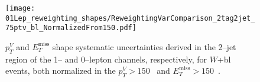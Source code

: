 \begin{figure}[ht!]
  \centering
  \texttt{[image: 01Lep\_reweighting\_shapes/ReweightingVarComparison\_2tag2jet\_75ptv\_bl\_NormalizedFrom150.pdf]}
  \caption[A normalised comparison of 0-- and 1--lepton channel derived $p_T^V$ and
  $E_T^{\text{miss}}$ shape systematic uncertainties on $W+$jets
  events.]{$p_T^V$ and $E_T^{\text{miss}}$ shape systematic uncertainties
    derived in the 2--jet region of the 1-- and 0--lepton channels,
    respectively, for $W$+bl events, both normalized in the $p_T^V > 150$~\GeV
    and $E_T^{\text{miss}} > 150$~\GeV.}
  \label{fig:wjets_01lep_2jet_bl_SysWPtVBDTr_From150}
\end{figure}